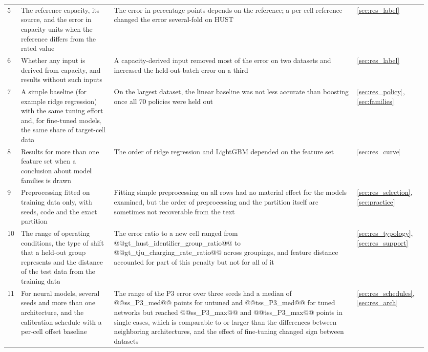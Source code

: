 \documentclass{ieeeaccess}
\begin{document}
\begin{table}[!t]
\begin{tabular}{p{}p{}p{}p{}}
5 & The reference capacity, its source, and the error in capacity units when the reference differs from the rated value & The error in percentage points depends on the reference; a per-cell reference changed the error several-fold on HUST & \ref{sec:res_label} \\
6 & Whether any input is derived from capacity, and results without such inputs & A capacity-derived input removed most of the error on two datasets and increased the held-out-batch error on a third & \ref{sec:res_label} \\
7 & A simple baseline (for example ridge regression) with the same tuning effort and, for fine-tuned models, the same share of target-cell data & On the largest dataset, the linear baseline was not less accurate than boosting once all 70 policies were held out & \ref{sec:res_policy}, \ref{sec:families} \\
8 & Results for more than one feature set when a conclusion about model families is drawn & The order of ridge regression and LightGBM depended on the feature set & \ref{sec:res_curve} \\
9 & Preprocessing fitted on training data only, with seeds, code and the exact partition & Fitting simple preprocessing on all rows had no material effect for the models examined, but the order of preprocessing and the partition itself are sometimes not recoverable from the text & \ref{sec:res_selection}, \ref{sec:practice} \\
10 & The range of operating conditions, the type of shift that a held-out group represents and the distance of the test data from the training data & The error ratio to a new cell ranged from @@gt_hust_identifier_group_ratio@@ to @@gt_tju_charging_rate_ratio@@ across groupings, and feature distance accounted for part of this penalty but not for all of it & \ref{sec:res_typology}, \ref{sec:res_support} \\
11 & For neural models, several seeds and more than one architecture, and the calibration schedule with a per-cell offset baseline & The range of the P3 error over three seeds had a median of @@ss_P3_med@@ points for untuned and @@tss_P3_med@@ for tuned networks but reached @@ss_P3_max@@ and @@tss_P3_max@@ points in single cases, which is comparable to or larger than the differences between neighboring architectures, and the effect of fine-tuning changed sign between datasets & \ref{sec:res_schedules}, \ref{sec:res_arch} \\
\bottomrule
\end{tabular}
\end{table}
\end{document}
